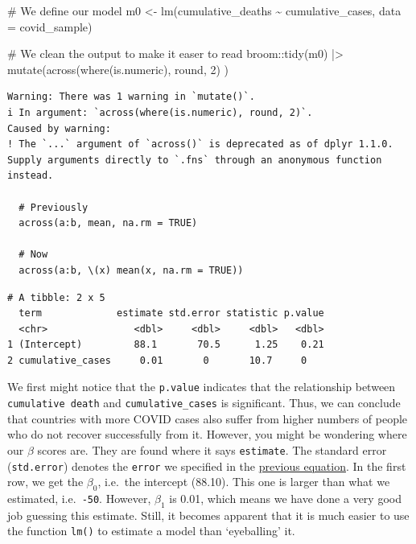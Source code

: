 \documentclass[
  letterpaper,
]{krantz}
\makeatletter
\newenvironment{Shaded}{\begin{snugshade}}{\end{snugshade}}
\newcommand{\AttributeTok}[1]{\textcolor[rgb]{0.40,0.45,0.13}{#1}}
\newcommand{\CommentTok}[1]{\textcolor[rgb]{0.37,0.37,0.37}{#1}}
\newcommand{\DecValTok}[1]{\textcolor[rgb]{0.68,0.00,0.00}{#1}}
\newcommand{\FunctionTok}[1]{\textcolor[rgb]{0.28,0.35,0.67}{#1}}
\newcommand{\NormalTok}[1]{\textcolor[rgb]{0.00,0.23,0.31}{#1}}
\newcommand{\OtherTok}[1]{\textcolor[rgb]{0.00,0.23,0.31}{#1}}
\newcommand{\SpecialCharTok}[1]{\textcolor[rgb]{0.37,0.37,0.37}{#1}}
\newenvironment{kframe}{%
\medskip{}
\setlength{\fboxsep}{.8em}
 \def\at@end@of@kframe{}%
 \ifinner\ifhmode%
  \def\at@end@of@kframe{\end{minipage}}%
  \begin{minipage}{\columnwidth}%
 \fi\fi%
 \def\FrameCommand##1{\hskip\@totalleftmargin \hskip-\fboxsep
 \colorbox{shadecolor}{##1}\hskip-\fboxsep
     \hskip-\linewidth \hskip-\@totalleftmargin \hskip\columnwidth}%
 \MakeFramed {\advance\hsize-\width
   \@totalleftmargin\z@ \linewidth\hsize
   \@setminipage}}%
 {\par\unskip\endMakeFramed%
 \at@end@of@kframe}
\renewenvironment{Shaded}{\begin{kframe}}{\end{kframe}}
\makeatother
\begin{document}
\begin{Shaded}
\begin{Highlighting}[]
\CommentTok{\# We define our model}
\NormalTok{m0 }\OtherTok{\textless{}{-}} \FunctionTok{lm}\NormalTok{(cumulative\_deaths }\SpecialCharTok{\textasciitilde{}}\NormalTok{ cumulative\_cases, }\AttributeTok{data =}\NormalTok{ covid\_sample)}

\CommentTok{\# We clean the output to make it easer to read}
\NormalTok{broom}\SpecialCharTok{::}\FunctionTok{tidy}\NormalTok{(m0) }\SpecialCharTok{|\textgreater{}}
  \FunctionTok{mutate}\NormalTok{(}\FunctionTok{across}\NormalTok{(}\FunctionTok{where}\NormalTok{(is.numeric),}
\NormalTok{                round, }\DecValTok{2}\NormalTok{)}
\NormalTok{         )}
\end{Highlighting}
\end{Shaded}

\begin{verbatim}
Warning: There was 1 warning in `mutate()`.
i In argument: `across(where(is.numeric), round, 2)`.
Caused by warning:
! The `...` argument of `across()` is deprecated as of dplyr 1.1.0.
Supply arguments directly to `.fns` through an anonymous function instead.

  # Previously
  across(a:b, mean, na.rm = TRUE)

  # Now
  across(a:b, \(x) mean(x, na.rm = TRUE))
\end{verbatim}

\begin{verbatim}
# A tibble: 2 x 5
  term             estimate std.error statistic p.value
  <chr>               <dbl>     <dbl>     <dbl>   <dbl>
1 (Intercept)         88.1       70.5      1.25    0.21
2 cumulative_cases     0.01       0       10.7     0   
\end{verbatim}

We first might notice that the \texttt{p.value} indicates that the
relationship between \texttt{cumulative\ death} and
\texttt{cumulative\_cases} is significant. Thus, we can conclude that
countries with more COVID cases also suffer from higher numbers of
people who do not recover successfully from it. However, you might be
wondering where our \(\beta\) scores are. They are found where it says
\texttt{estimate}. The standard error (\texttt{std.error}) denotes the
\texttt{error} we specified in the
\hyperref[single-linear-regression]{previous equation}. In the first
row, we get the \(\beta_0\), i.e.~the intercept (88.10). This one is
larger than what we estimated, i.e.~\texttt{-50}. However, \(\beta_1\)
is 0.01, which means we have done a very good job guessing this
estimate. Still, it becomes apparent that it is much easier to use the
function \texttt{lm()} to estimate a model than `eyeballing' it.
\end{document}
